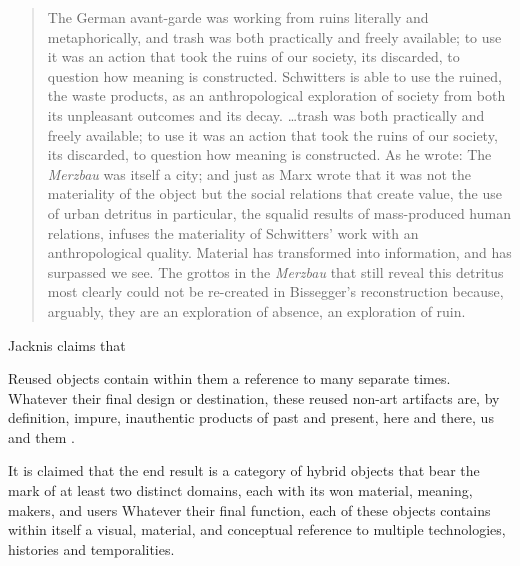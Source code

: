 \begin{quote}
The German avant-garde was working from ruins literally and metaphorically, and trash was both practically and freely available; to use it was an action that took the ruins of our society, its discarded, to question how meaning is constructed. Schwitters is able to use the ruined, the waste products, as an anthropological exploration of society from both its unpleasant outcomes and its decay. \ldots trash was both practically and freely available; to use it was an action that took the ruins of our society, its discarded, to question how meaning is constructed. As he wrote:  The \textit{Merzbau} was itself a city; and just as Marx wrote that it was not the materiality of the object but the social relations that create value, the use of urban detritus in particular, the squalid results of mass-produced human relations, infuses the materiality of Schwitters’ work with an anthropological quality. Material has transformed into information, and  has surpassed  we see. The grottos in the \textit{Merzbau} that still reveal this detritus most clearly could not be re-created in Bissegger’s reconstruction because, arguably, they are an exploration of absence, an exploration of ruin.
\end{quote}

Jacknis \citep[as cited in][]{cerny1996recycled} claims that 

Reused objects contain within them a reference to many separate times. Whatever their final design or destination, these reused non-art artifacts are, by definition, impure, inauthentic products of past and present, here and there, us and them \citep{cerny1996recycled}.

It is claimed that the end result is a category of hybrid objects that bear the mark of at least two distinct domains, each with its won material, meaning, makers, and users \citep{cerny1996recycled} Whatever their final function, each of these objects contains within itself a visual, material, and conceptual reference to multiple technologies, histories and temporalities.


